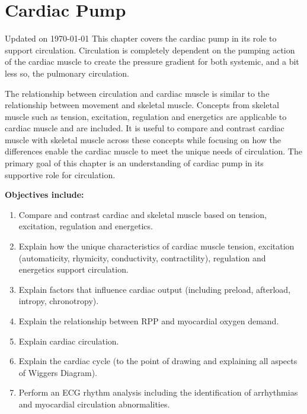 
\chapter{Cardiac Pump}\label{chp:cardiac_pump}
Updated on \today
\minitoc
This chapter covers the cardiac pump in its role to support circulation. Circulation is completely dependent on the pumping action of the cardiac muscle to create the pressure gradient for both systemic, and a bit less so, the pulmonary circulation. 

The relationship between circulation and cardiac muscle is similar to the relationship between movement and skeletal muscle. Concepts from skeletal muscle such as tension, excitation, regulation and energetics are applicable to cardiac muscle and are included. It is useful to compare and contrast cardiac muscle with skeletal muscle across these concepts while focusing on how the differences enable the cardiac muscle to meet the unique needs of circulation. The primary goal of this chapter is an understanding of cardiac pump in its supportive role for circulation. 

\vspace{5mm}
\begin{svgraybox}
\textbf{Objectives include:}
\begin{enumerate}
    \item Compare and contrast cardiac and skeletal muscle based on tension, excitation, regulation and energetics.
    \item Explain how the unique characteristics of cardiac muscle tension, excitation (automaticity, rhymicity, conductivity, contractility), regulation and energetics support circulation.
    \item Explain factors that influence cardiac output (including preload, afterload, intropy, chronotropy).
    \item Explain the relationship between RPP and myocardial oxygen demand.
    \item Explain cardiac circulation.
    \item Explain the cardiac cycle (to the point of drawing and explaining all aspects of Wiggers Diagram).
    \item Perform an ECG rhythm analysis including the identification of arrhythmias and myocardial circulation abnormalities.
\end{enumerate}
\end{svgraybox}

